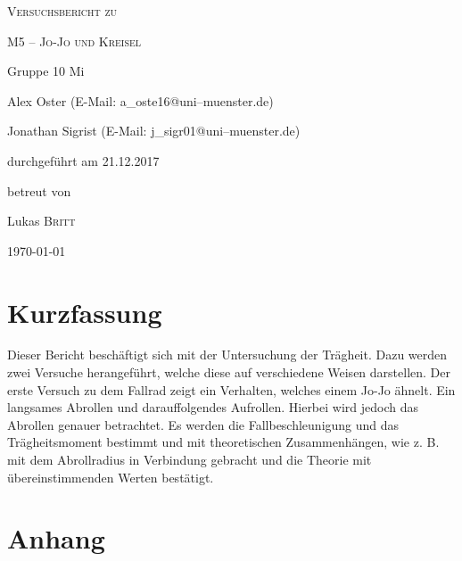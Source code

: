 \documentclass[11pt,a4paper,titlepage, ngerman]{article}
\begin{document}
	\begin{titlepage}
		\centering
		{\scshape\LARGE Versuchsbericht zu \par}
		\vspace{1cm}
		{\scshape\huge M5 -- Jo-Jo und Kreisel\par}
		\vspace{2.5cm}
		{\LARGE Gruppe 10 Mi\par}
		\vspace{0.5cm}
		{\large Alex Oster (E-Mail: a\_oste16@uni--muenster.de) \par}
		{\large Jonathan Sigrist (E-Mail: j\_sigr01@uni--muenster.de) \par}
		\vfill
		durchgeführt am 21.12.2017\par
		betreut von\par
		{\large Lukas \textsc{Britt}} 
		\vfill	
		{\large \today\par}
	\end{titlepage}
	
	\tableofcontents
	
	\newpage
	
	\section{Kurzfassung}
	
	
	Dieser Bericht beschäftigt sich mit der Untersuchung der Trägheit. Dazu werden zwei Versuche herangeführt, welche diese auf verschiedene Weisen darstellen.
	Der erste Versuch zu dem Fallrad zeigt ein Verhalten, welches einem Jo-Jo ähnelt. Ein langsames Abrollen und darauffolgendes Aufrollen. Hierbei wird jedoch das Abrollen genauer betrachtet. Es werden die Fallbeschleunigung und das Trägheitsmoment bestimmt und mit theoretischen Zusammenhängen, wie z. B. mit dem Abrollradius in Verbindung gebracht und die Theorie mit übereinstimmenden Werten bestätigt.
			
	\vspace{2cm} 
	
	 
	\newpage
	 
	
	
	\newpage
	
	\section{Anhang} \label{Anhang}
		
\end{document}

